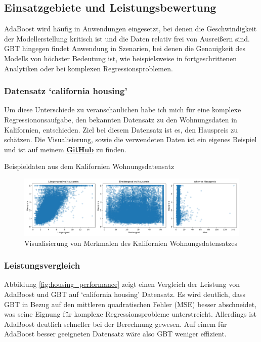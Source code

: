\subsection{Einsatzgebiete und Leistungsbewertung}
AdaBoost wird häufig in Anwendungen eingesetzt, bei denen die Geschwindigkeit der Modellerstellung kritisch ist und die Daten relativ frei von Ausreißern sind. GBT hingegen findet Anwendung in Szenarien, bei denen die Genauigkeit des Modells von höchster Bedeutung ist, wie beispielsweise in fortgeschrittenen Analytiken oder bei komplexen Regressionsproblemen.

\subsubsection{Datensatz `california housing'}
Um diese Unterschiede zu veranschaulichen habe ich mich für eine komplexe Regressiononsaufgabe, den bekannten Datensatz zu den Wohnungsdaten in Kalifornien, entschieden. Ziel bei diesem Datensatz ist es, den Hauspreis zu schätzen. Die Visualisierung, sowie die verwendeten Daten ist ein eigenes Beispiel und ist auf meinem \textbf{\href{https://github.com/CodeLtDave/Boosting-Algorithms-ML-Seminararbeit/blob/main/python-env/VergleichAdaBoostGBT.ipynb}{GitHub}} zu finden.

\begin{table}[ht]
    \centering
    \caption{Beispieldaten aus dem Kalifornien Wohnungsdatensatz}
    \label{tab:housing_data}
    \resizebox{\textwidth}{!}{
    
    }
\end{table}
    

\begin{figure}[ht]
    \centering
    \includegraphics[width=\textwidth]{Images/housing_features.png}
    \caption{Visualisierung von Merkmalen des Kalifornien Wohnungsdatensatzes}
    \label{fig:housing_features}
\end{figure}

\subsubsection{Leistungsvergleich}
Abbildung \ref{fig:housing_performance} zeigt einen Vergleich der Leistung von AdaBoost und GBT auf `california housing' Datensatz. Es wird deutlich, dass GBT in Bezug auf den mittleren quadratischen Fehler (MSE) besser abschneidet, was seine Eignung für komplexe Regressionsprobleme unterstreicht. Allerdings ist AdaBoost deutlich schneller bei der Berechnung gewesen. Auf einem für AdaBoost besser geeigneten Datensatz wäre also GBT weniger effizient.

